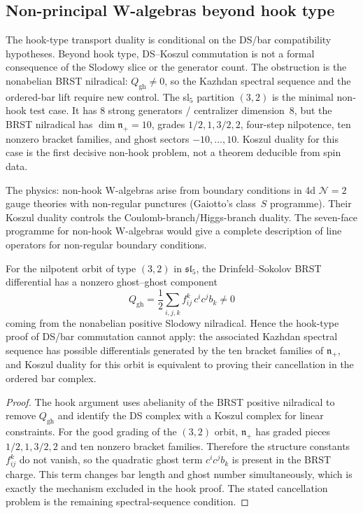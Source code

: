 \documentclass[11pt]{article}
\newcommand{\cN}{\mathcal{N}}
\newcommand{\fn}{\mathfrak{n}}
\begin{document}
\subsection{Non-principal W-algebras beyond hook type}

The hook-type transport duality is conditional on the DS/bar
compatibility hypotheses.  Beyond hook type, DS--Koszul
commutation is not a formal consequence of the Slodowy slice or
the generator count.  The obstruction is the nonabelian BRST
nilradical: $Q_{\mathrm{gh}}\ne0$, so the Kazhdan spectral
sequence and the ordered-bar lift require new control.  The
sl$_5$ partition $(3,2)$ is the minimal non-hook test case.  It
has $8$ strong generators / centralizer dimension~$8$, but the
BRST nilradical has $\dim\fn_+=10$, grades
$1/2,1,3/2,2$, four-step nilpotence, ten nonzero bracket
families, and ghost sectors $-10,\ldots,10$.  Koszul duality for
this case is the first decisive non-hook problem, not a theorem
deducible from spin data.

The physics: non-hook W-algebras arise from boundary conditions in 4d
$\cN=2$ gauge theories with non-regular punctures (Gaiotto's class~$S$
programme).  Their Koszul duality controls the Coulomb-branch/Higgs-branch
duality.  The seven-face programme for non-hook W-algebras would give a
complete description of line operators for non-regular boundary
conditions.

\begin{proposition}
\label{prop:nonhook-sl5-32-brst-obstruction}
For the nilpotent orbit of type $(3,2)$ in $\mathfrak{sl}_5$,
the Drinfeld--Sokolov BRST differential has a nonzero
ghost--ghost component
\[
  Q_{\mathrm{gh}}
  =
  \frac12\sum_{i,j,k} f^k_{ij}\,c^i c^j b_k
  \ne 0
\]
coming from the nonabelian positive Slodowy nilradical.  Hence
the hook-type proof of DS/bar commutation cannot apply:
the associated Kazhdan spectral sequence has possible
differentials generated by the ten bracket families of
$\fn_+$, and Koszul duality for this orbit is equivalent to
proving their cancellation in the ordered bar complex.
\end{proposition}

\begin{proof}
The hook argument uses abelianity of the BRST positive nilradical
to remove $Q_{\mathrm{gh}}$ and identify the DS complex with a
Koszul complex for linear constraints.  For the good grading of
the $(3,2)$ orbit, $\fn_+$ has graded pieces
$1/2,1,3/2,2$ and ten nonzero bracket families.  Therefore the
structure constants $f^k_{ij}$ do not vanish, so the quadratic
ghost term $c^i c^j b_k$ is present in the BRST charge.  This
term changes bar length and ghost number simultaneously, which
is exactly the mechanism excluded in the hook proof.  The stated
cancellation problem is the remaining spectral-sequence
condition.
\end{proof}
\end{document}
